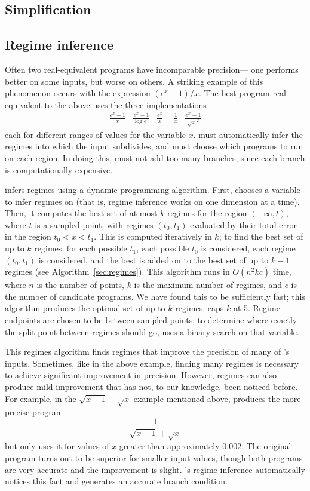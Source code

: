 \documentclass[paper.tex]{subfiles}
\begin{document}
\subsection{Simplification}


\subsection{Regime inference}

Often two real-equivalent programs have incomparable precision---%
  one performs better on some inputs, but worse on others.
A striking example of this phenomenon occurs with the expression $(e^x - 1) / x$.
The best program real-equivalent to the above
  uses the three implementations
\begin{align*}
  \frac{e^x - 1}{x} & \frac{e^x - 1}{\log e^x} &
  \frac{e^x}{x} - \frac1x & \frac{e^x - 1}{\sqrt{x}^2} 
\end{align*}
  each for different ranges of values for the variable $x$.
\casio must automatically infer the regimes
  into which the input subdivides,
  and must choose which programs to run on each region.
In doing this, \casio must not add too many branches,
  since each branch is computationally expensive.

\casio infers regimes using a dynamic programming algorithm.
First, \casio chooses a variable to infer regimes on
  (that is, regime inference works on one dimension at a time).
Then, it computes the best set of at most $k$ regimes
  for the region $(-\infty, t)$, where $t$ is a sampled point,
  with regimes $(t_0, t_1)$ evaluated by their total error
  in the region $t_0 < x < t_1$.
This is computed iteratively in $k$;
  to find the best set of up to $k$ regimes,
  for each possible $t_1$, each possible $t_0$ is considered,
  each regime $(t_0, t_1)$ is considered,
  and the best is added on to the best set of up to $k-1$ regimes
  (see Algorithm~\ref{sec:regimes}).
This algorithm runs in $O(n^2 k c)$ time,
  where $n$ is the number of points,
  $k$ is the maximum number of regimes,
  and $c$ is the number of candidate programs.
We have found this to be sufficiently fast;
  this algorithm produces the optimal set of up to $k$ regimes.
\casio caps $k$ at 5.
Regime endpoints are chosen to be between sampled points;
  to determine where exactly the split point between regimes should go,
  \casio uses a binary search on that variable.

This regimes algorithm finds regimes that improve
  the precision of many of \casio's inputs.
Sometimes, like in the above example,
  finding many regimes is necessary to achieve significant improvement
  in precision.
However, regimes can also produce mild improvement
  that has not, to our knowledge, been noticed before.
For example, in the $\sqrt{x+1} - \sqrt{x}$ example mentioned above,
  \casio produces the more precise program
\[
\frac{1}{\sqrt{x+1} + \sqrt{x}}
\]
  but only uses it for values of $x$ greater than approximately $0.002$.
The original program turns out to be superior for smaller input values,
  though both programs are very accurate and the improvement is slight.
\casio's regime inference automatically notices this fact
  and generates an accurate branch condition.
\end{document}
